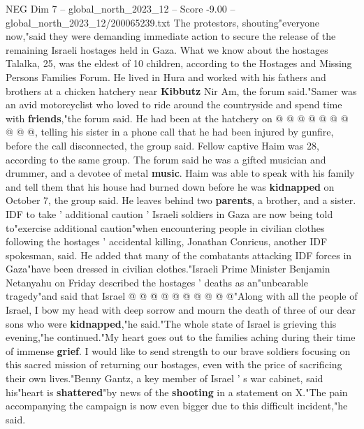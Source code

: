\begin{textsample}{NEG Dim 7 – global\_north\_2023\_12 – Score -9.00 – global\_north\_2023\_12/200065239.txt}
The protestors, shouting"everyone now,"said they were demanding immediate action to secure the release of the remaining Israeli hostages held in Gaza.
What we know about the hostages Talalka, 25, was the eldest of 10 children, according to the Hostages and Missing Persons Families Forum.
He lived in Hura and worked with his fathers and brothers at a chicken hatchery near \textbf{Kibbutz} Nir Am, the forum said."Samer was an avid motorcyclist who loved to ride around the countryside and spend time with \textbf{friends},"the forum said.
He had been at the hatchery on @ @ @ @ @ @ @ @ @ @, telling his sister in a phone call that he had been injured by gunfire, before the call disconnected, the group said.
Fellow captive Haim was 28, according to the same group.
The forum said he was a gifted musician and drummer, and a devotee of metal \textbf{music}.
Haim was able to speak with his family and tell them that his house had burned down before he was \textbf{kidnapped} on October 7, the group said.
He leaves behind two \textbf{parents}, a brother, and a sister.
IDF to take ' additional caution ' Israeli soldiers in Gaza are now being told to"exercise additional caution"when encountering people in civilian clothes following the hostages ' accidental killing, Jonathan Conricus, another IDF spokesman, said.
He added that many of the combatants attacking IDF forces in Gaza"have been dressed in civilian clothes."Israeli Prime Minister Benjamin Netanyahu on Friday described the hostages ' deaths as an"unbearable tragedy"and said that Israel @ @ @ @ @ @ @ @ @ @"Along with all the people of Israel, I bow my head with deep sorrow and mourn the death of three of our dear sons who were \textbf{kidnapped},"he said."The whole state of Israel is grieving this evening,"he continued."My heart goes out to the families aching during their time of immense \textbf{grief}.
I would like to send strength to our brave soldiers focusing on this sacred mission of returning our hostages, even with the price of sacrificing their own lives."Benny Gantz, a key member of Israel ' s war cabinet, said his"heart is \textbf{shattered}"by news of the \textbf{shooting} in a statement on X."The pain accompanying the campaign is now even bigger due to this difficult incident,"he said.

\end{textsample}
